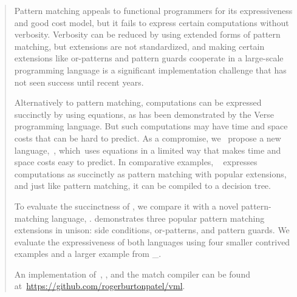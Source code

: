 \documentclass[article,screen,12pt, nonacm]{acmart}
\begin{document}
\begin{abstract}
    Pattern matching %
    appeals %
    to functional programmers for its expressiveness and good cost model, 
    but 
    it %
    fails to express %
    certain computations without verbosity. Verbosity %
    can be reduced %
    by using extended forms of pattern matching,
    but extensions %
    are %
    not standardized, and making certain extensions like or-patterns and pattern
    guards cooperate in a large-scale programming language is a significant
    implementation challenge that has not seen success until recent years. 
    
    
    Alternatively to pattern matching, computations can be expressed succinctly
    by using equations, as has been demonstrated by the Verse programming
    language. But such computations may have time and space costs that can be
    hard to predict. 
    As a compromise, 
    we %
    ~propose %
    a new language,~\VMinus, %
    which~uses equations in a limited way that makes time and space costs easy
    to predict. 
    In
    comparative examples,
    \VMinus~ %
    expresses %
    computations as succinctly as pattern matching with popular extensions, and just like pattern matching, it %
    can be compiled %
    to a decision tree. 
    
    To evaluate %
    the succinctness of \VMinus,
    we compare %
    it with a novel pattern-matching language, \PPlus. \PPlus
    demonstrates  %
    three popular pattern matching extensions 
    in unison: side conditions, or-patterns, and pattern guards. 
    We evaluate %
    the expressiveness of both languages using four smaller contrived examples 
    and a larger example from \_. 

    An implementation of~\VMinus, \PPlus, and the match compiler can be found
    at~\url{https://github.com/rogerburtonpatel/vml}.
\end{abstract}
\end{document}

